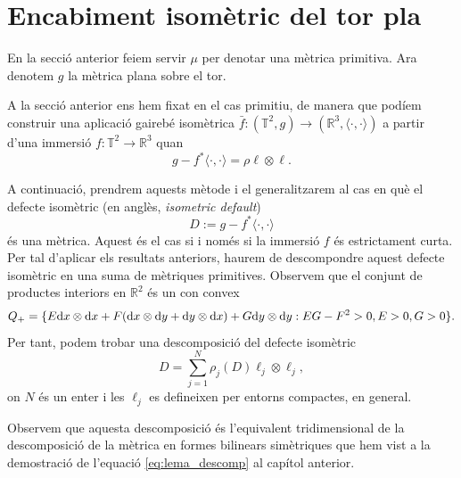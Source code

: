 
\section{Encabiment isomètric del tor pla}
\begin{nota}
    En la secció anterior feiem servir $\mu$ per denotar una mètrica primitiva. Ara denotem $g$ la mètrica plana sobre el tor.
\end{nota}

A la secció anterior ens hem fixat en el cas primitiu, de manera que podíem construir una aplicació gairebé isomètrica $\bar f:(\mathbb T^2, g)\to(\mathbb R^3, \langle\cdot, \cdot\rangle)$ a partir d'una immersió $f:\mathbb T^2\to\mathbb R^3$ quan
\begin{equation*}
    g - f^*\langle\cdot, \cdot\rangle = \rho\ell\otimes\ell.
\end{equation*}

A continuació, prendrem aquests mètode i el generalitzarem al cas en què el defecte isomètric (en anglès, \textit{isometric default}) 
\begin{equation*}
    D:=g-f^*\langle\cdot, \cdot\rangle
\end{equation*}
és una mètrica. Aquest és el cas si i només si la immersió $f$ és estrictament curta. Per tal d'aplicar els resultats anteriors, haurem de descompondre aquest defecte isomètric en una suma de mètriques primitives. Observem que el conjunt de productes interiors en $\mathbb R^2$ és un con convex
\begin{equation*}
    Q_+ = \{E\text dx\otimes\text dx + F(\text dx\otimes\text dy + \text dy\otimes\text dx) + G\text dy\otimes\text dy : EG-F^2>0, E>0, G>0\}.
\end{equation*}
Per tant, podem trobar una descomposició del defecte isomètric
\begin{equation*}
    D = \sum_{j=1}^N \rho_j(D) \ell_j\otimes\ell_j,
\end{equation*}
on $N$ és un enter i les $\ell_j$ es defineixen per entorns compactes, en general.
\begin{obs}
    Observem que aquesta descomposició és l'equivalent tridimensional de la descomposició de la mètrica en formes bilinears simètriques que hem vist a la demostració de l'equació \eqref{eq:lema_descomp} al capítol anterior.
\end{obs}

